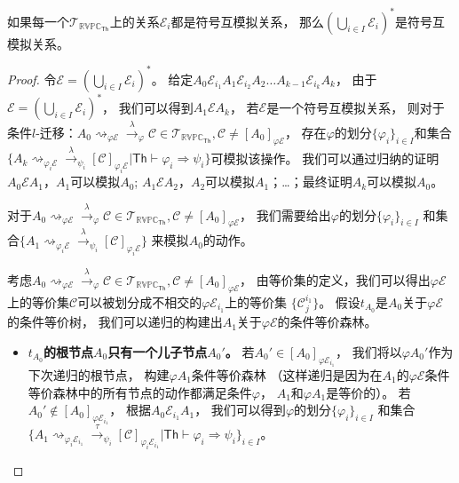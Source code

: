 \begin{lemma}\label{lemma:closure}
   如果每一个$\mathcal{T}_{\mathbb{RVPC}_{\mathsf{Th}}}$上的关系$\mathcal{E}_i$都是符号互模拟关系，
   那么$(\bigcup_{i\in I}\mathcal{E}_i)^*$是符号互模拟关系。
\end{lemma}
\begin{proof}
   令$\mathcal{E}=(\bigcup_{i\in I}\mathcal{E}_i)^*$。
   给定$A_0\mathcal{E}_{i_1}A_1\mathcal{E}_{i_2}A_2\dots A_{k-1}\mathcal{E}_{i_k} A_k$，
   由于$\mathcal{E}=(\bigcup_{i\in I}\mathcal{E}_{i})^*$，
   我们可以得到$A_1\mathcal{E}A_k$，
   若$\mathcal{E}$是一个符号互模拟关系，
   则对于条件$l$-迁移：$A_0\rightsquigarrow_{\varphi\mathcal{E}}\stackrel{\lambda}{\rightarrow}_{\varphi} \mathcal{C}\in \mathcal{T}_{\mathbb{RVPC}_{\mathsf{Th}}},\mathcal{C}\neq [A_0]_{\varphi\mathcal{E}}$，
   存在$\varphi$的划分$\{\varphi_i\}_{i\in I}$和集合
   $\{A_k\rightsquigarrow_{\varphi_i\mathcal{E}}\stackrel{\lambda}{\rightarrow}_{\psi_i}[\mathcal{C}]_{\varphi_i\mathcal{E}}|\mathsf{Th}\vdash \varphi_i\Rightarrow\psi_i\}$可模拟该操作。
   我们可以通过归纳的证明$A_0\mathcal{E}A_1$，$A_1$可以模拟$A_0$;
   $A_1\mathcal{E}A_2$，$A_2$可以模拟$A_1$；\dots；最终证明$A_k$可以模拟$A_0$。

   对于$A_0\rightsquigarrow_{\varphi\mathcal{E}}\stackrel{\lambda}{\rightarrow}_{\varphi} \mathcal{C}\in \mathcal{T}_{\mathbb{RVPC}_{\mathsf{Th}}},\mathcal{C}\neq [A_0]_{\varphi\mathcal{E}}$，
   我们需要给出$\varphi$的划分$\{\varphi_i\}_{i\in I}$
   和集合$\{A_1\rightsquigarrow_{\varphi_i\mathcal{E}}\stackrel{\lambda}{\rightarrow}_{\psi_i}[\mathcal{C}]_{\varphi_i\mathcal{E}}\}$
   来模拟$A_0$的动作。

   考虑$A_0\rightsquigarrow_{\varphi\mathcal{E}}\stackrel{\lambda}{\rightarrow}_{\varphi} \mathcal{C}\in \mathcal{T}_{\mathbb{RVPC}_{\mathsf{Th}}},\mathcal{C}\neq [A_0]_{\varphi\mathcal{E}}$，
   由等价集的定义，我们可以得出$\varphi\mathcal{E}$上的等价集$\mathcal{C}$可以被划分成不相交的$\varphi\mathcal{E}_{i_1}$上的等价集
   $\{\mathcal{C}_j^{i_1}\}$。
   假设$t_{A_0}$是$A_0$关于$\varphi\mathcal{E}$的条件等价树，
   我们可以递归的构建出$A_1$关于$\varphi\mathcal{E}$的条件等价森林。

   \begin{itemize}
      \item {
         \textbf{$t_{A_0}$的根节点$A_0$只有一个儿子节点$A_0'$。}
         若$A_0'\in[A_0]_{\varphi\mathcal{E}_{i_1}}$，
         我们将以$\varphi A_0'$作为下次递归的根节点，
         构建$\varphi A_1$条件等价森林
         （这样递归是因为在$A_1$的$\varphi\mathcal{E}$条件等价森林中的所有节点的动作都满足条件$\varphi$，
         $A_1$和$\varphi A_1$是等价的）。
         若$A_0'\notin[A_0]_{\varphi\mathcal{E}_{i_1}}$，
         根据$A_0\mathcal{E}_{i_1}A_1$，
         我们可以得到$\varphi$的划分$\{\varphi_i\}_{i\in I}$
         和集合$\{A_1\rightsquigarrow_{\varphi_i\mathcal{E}_{i_1}}\stackrel{\tau}{\rightarrow}_{\psi_i}[\mathcal{C}]_{\varphi_i\mathcal{E}_{i_1}}|\mathsf{Th}\vdash \varphi_i\Rightarrow \psi_i\}_{i\in I}$。
         
}
\end{itemize}
\end{proof}
